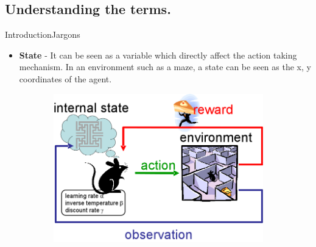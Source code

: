 \documentclass[10pt]{beamer}
\begin{document}
\subsection{Understanding the terms.}
\begin{frame}{Introduction}{Jargons}

\begin{itemize}
\item \textbf{State} - It can be seen as a variable which directly affect the action taking mechanism. 
In an environment such as a maze, a state can be seen as the x, y coordinates of the agent.

\end{itemize}

\begin{figure}[!htb]
\centering
\begin{subfigure}[t]{0.6\linewidth}
\includegraphics[width=.9\textwidth]{assets/mouserl.png}
\end{subfigure}

\vspace{0.1in}
\label{fig:tripEmb}
\end{figure}

\end{frame}
\end{document}
